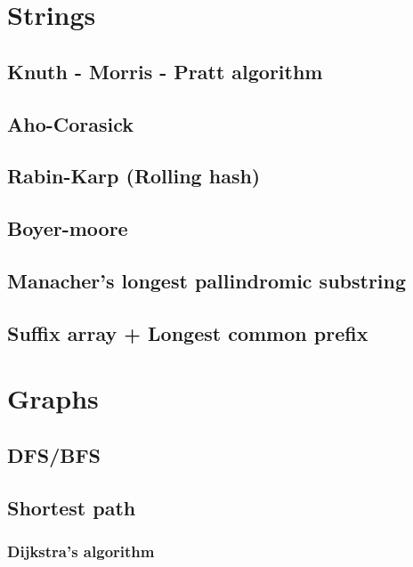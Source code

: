 \documentclass[a4paper]{article}
\begin{document}
\begin{multicols*}{3}
\setlength{\parskip}{0.0in}
\tableofcontents
\setlength{\parskip}{0.1in}


\section{Strings}
    \subsection{Knuth - Morris - Pratt algorithm}
        
    \subsection{Aho-Corasick}
        
    \subsection{Rabin-Karp (Rolling hash)}
        
    \subsection{Boyer-moore}
        
    \subsection{Manacher's longest pallindromic substring}
        
    \subsection{Suffix array + Longest common prefix}
        

\section{Graphs}
    \subsection{DFS/BFS}
        
    \subsection{Shortest path}
        \subsubsection{Dijkstra's algorithm}
            

\end{multicols*}
\end{document}

